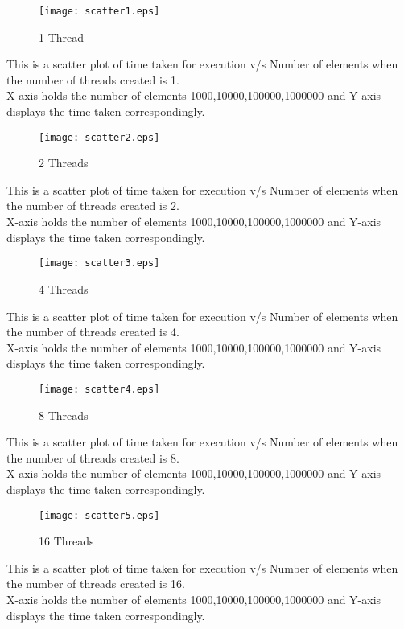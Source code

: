 \documentclass{article}
\begin{document}
\maketitle

\clearpage
\begin{figure}
\texttt{[image: scatter1.eps]}
\caption{1 Thread}
\label{fig:Scatter1 graph}
\end{figure}
\noindent
This is a scatter plot of time taken for execution v/s Number of elements when the number of threads created is 1. \\
X-axis holds the number of elements {1000,10000,100000,1000000} and Y-axis displays the time taken correspondingly.
\clearpage

\begin{figure}
\texttt{[image: scatter2.eps]}
\caption{2 Threads}
\label{fig:Scatter2 graph}
\end{figure}
\noindent
This is a scatter plot of time taken for execution v/s Number of elements when the number of threads created is 2. \\
X-axis holds the number of elements {1000,10000,100000,1000000} and Y-axis displays the time taken correspondingly.
\clearpage

\begin{figure}
\texttt{[image: scatter3.eps]}
\caption{4 Threads}
\label{fig:Scatter3 graph}
\end{figure}
\noindent
This is a scatter plot of time taken for execution v/s Number of elements when the number of threads created is 4. \\
X-axis holds the number of elements {1000,10000,100000,1000000} and Y-axis displays the time taken correspondingly.
\clearpage

\begin{figure}
\texttt{[image: scatter4.eps]}
\caption{8 Threads}
\label{fig:Scatter4 graph}
\end{figure}
\noindent
This is a scatter plot of time taken for execution v/s Number of elements when the number of threads created is 8. \\
X-axis holds the number of elements {1000,10000,100000,1000000} and Y-axis displays the time taken correspondingly.
\clearpage

\begin{figure}
\texttt{[image: scatter5.eps]}
\caption{16 Threads}
\label{fig:Scatter5 graph}
\end{figure}
\noindent
This is a scatter plot of time taken for execution v/s Number of elements when the number of threads created is 16. \\
X-axis holds the number of elements {1000,10000,100000,1000000} and Y-axis displays the time taken correspondingly.
\clearpage
\end{document}
